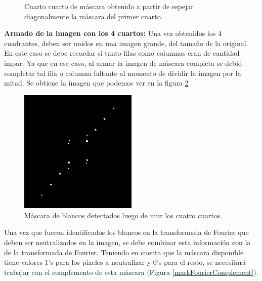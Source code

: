 \documentclass[10pt,a4paper, twoside]{report}
\newcounter{subsubsubsection}[subsubsection]
\begin{document}
\begin{figure}[!htb]
\begin {minipage}{0.48\textwidth}
			\caption{Cuarto cuarto de máscara obtenido a partir de espejar diagonalmente la máscara del primer cuarto.}
			\label{fourthQuarterMask}
   \end{minipage}
\end{figure}

\textbf{Armado de la imagen con los 4 cuartos:} Una vez obtenidos los 4 cuadrantes, deben ser unidos en una imagen grande, del tamaño de la original. En este caso se debe recordar si tanto filas como columnas eran de cantidad impar. Ya que en ese caso, al armar la imagen de máscara completa se debió completar tal fila o columna faltante al momento de dividir la imagen por la mitad. Se obtiene la imagen que podemos ver en la figura \ref{maskFourierComplete}

\begin{figure}[!htb]
   \centering      
   \includegraphics[width=0.5\textwidth]{imagenes/maskFourierComplete.jpg}
 \caption{Máscara de blancos detectados luego de unir los cuatro cuartos.}
 \label{maskFourierComplete}
\end{figure}




Una vez que fueron identificados los blancos en la transformada de Fourier que deben ser neutralizados en la imagen, se debe combinar esta información con la de la transformada de Fourier.
Teniendo en cuenta que la máscara disponible tiene valores 1's para los píxeles a neutralizar y 0's para el resto, se necesitará trabajar con el complemento de esta máscara (Figura \ref{maskFourierComplement}). 
\end{document}

